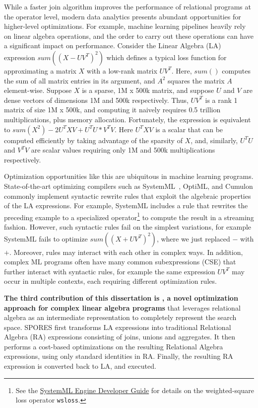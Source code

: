 While a faster join algorithm improves the performance of 
 relational programs at the operator level,
 modern data analytics presents abundant opportunities
 for higher-level optimizations.
For example, machine learning pipelines heavily rely on 
 linear algebra operations,
 and the order to carry out these operations
 can have a significant impact on performance.
Consider the Linear Algebra (LA) expression $sum((X-UV^T)^2)$ which
defines a typical loss function for approximating a matrix $X$ with a
low-rank matrix $UV^T$. Here, $sum()$ computes the sum of all matrix
entries in its argument, and $A^2$ squares the matrix $A$
element-wise. Suppose $X$ is a sparse, 1M x 500k matrix, and suppose
$U$ and $V$ are dense vectors of dimensions 1M and 500k respectively.
Thus, $UV^T$ is a rank 1 matrix of size 1M x 500k, and computing it
naively requires 0.5 trillion multiplications, plus memory allocation.
Fortunately, the expression is equivalent to
$sum(X^2) - 2U^TXV + U^TU * V^TV$.  Here $U^TXV$ is a scalar that can
be computed efficiently by taking advantage of the sparsity of $X$,
and, similarly, $U^TU$ and $V^TV$ are scalar values requiring only 1M
and 500k multiplications respectively.

Optimization opportunities like this are ubiquitous in machine
learning programs. State-of-the-art optimizing compilers such as
SystemML~\cite{DBLP:reference/bdt/Boehm19},
OptiML\cite{DBLP:conf/icml/SujeethLBRCWAOO11}, and
Cumulon\cite{DBLP:conf/sigmod/HuangB013} commonly implement syntactic
rewrite rules that exploit the algebraic properties of the LA
expressions. For example, SystemML includes a rule that rewrites the
preceding example to a specialized operator\footnote{See the
  \href{https://systemml.apache.org/docs/0.12.0/engine-dev-guide.html}{SystemML
    Engine Developer Guide} for details on the weighted-square loss
  operator \texttt{wsloss}. } to compute the result in a streaming
fashion.  However, such syntactic rules fail on the simplest
variations, for example SystemML fails to optimize $sum((X+UV^T)^2)$,
where we just replaced $-$ with $+$.  Moreover, rules may interact
with each other in complex ways.  In addition, complex ML programs
often have many common subexpressions (CSE) that further interact
with syntactic rules, for example the same expression $UV^T$ may occur
in multiple contexts, each requiring different optimization rules.

\textbf{The third contribution of this dissertation is \sys, a novel optimization approach for
complex linear algebra programs} that leverages relational algebra as
an intermediate representation to completely represent the search
space.
SPORES first transforms LA expressions into traditional
Relational Algebra (RA) expressions consisting of joins, unions 
and aggregates.  It then performs a cost-based optimizations on
the resulting Relational Algebra expressions, using only standard
identities in RA.  Finally, the resulting RA expression is converted
back to LA, and executed.

